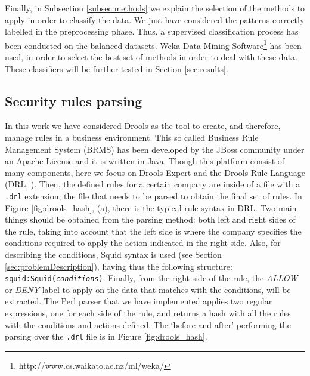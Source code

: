 \documentclass{llncs}
\begin{document}
Finally, in Subsection \ref{subsec:methods} we explain the selection of the methods to apply in order to classify the data. We just have considered the patterns correctly labelled in the preprocessing phase. Thus, a supervised classification process \cite{classification_67} has been conducted on the balanced datasets.
Weka Data Mining Software\footnote{http://www.cs.waikato.ac.nz/ml/weka/} has been used, in order to select the best set of methods in order to deal with these data. These classifiers will be further tested in Section \ref{sec:results}.

%
\subsection{Security rules parsing}
\label{subsec:ruleparsing}

\noindent In this work we have considered Drools \cite{drools:site}
as the tool to create, and therefore, manage rules in a business environment. This so called Business Rule Management System (BRMS) has been developed by the JBoss community under an Apache License and it is written in Java. Though this platform consist of many components, here we focus on Drools Expert and the Drools Rule Language (DRL, \cite{drools:doc}). Then, the defined rules for a certain company are inside of a file with a \texttt{.drl} extension, the file that needs to be parsed to obtain the final set of rules. In Figure \ref{fig:drools_hash}, (a), there is the typical rule syntax in DRL. Two main things should be obtained from the parsing method: both left and right sides of the rule, taking into account that the left side is where the company specifies the conditions required to apply the action indicated in the right side. Also, for describing the conditions, Squid syntax is used (see Section \ref{sec:problemDescription}), having thus the following structure: \texttt{squid:Squid(\textit{conditions})}. Finally, from the right side of the rule, the \textit{ALLOW} or \textit{DENY} label to apply on the data that matches with the conditions, will be extracted. The Perl parser that we have implemented applies two regular expressions, one for each side of the rule, and returns a hash with all the rules with the conditions and actions defined. The `before and after' performing the parsing over the \texttt{.drl} file is in Figure \ref{fig:drools_hash}.
\end{document}
